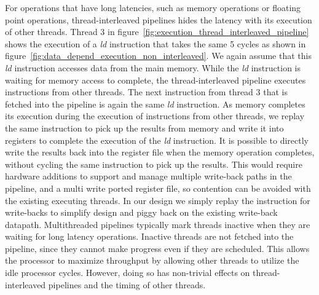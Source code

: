 For operations that have long latencies, such as memory operations or floating point operations, thread-interleaved pipelines hides the latency with its execution of other threads. 
Thread 3 in figure~\ref{fig:execution_thread_interleaved_pipeline} shows the execution of a \emph{ld} instruction that takes the same 5 cycles as shown in figure~\ref{fig:data_depend_execution_non_interleaved}.
We again assume that this \emph{ld} instruction accesses data from the main memory. 
While the \emph{ld} instruction is waiting for memory access to complete, the thread-interleaved pipeline executes instructions from other threads.
The next instruction from thread 3 that is fetched into the pipeline is again the same \emph{ld} instruction.  
As memory completes its execution during the execution of instructions from other threads, we replay the same instruction to pick up the results from memory and write it into registers to complete the execution of the \emph{ld} instruction. 
It is possible to directly write the results back into the register file when the memory operation completes, without cycling the same instruction to pick up the results.
This would require hardware additions to support and manage multiple write-back paths in the pipeline, and a multi write ported register file, so contention can be avoided with the existing executing threads.
In our design we simply replay the instruction for write-backs to simplify design and piggy back on the existing write-back datapath.
Multithreaded pipelines typically mark threads inactive when they are waiting for long latency operations.
Inactive threads are not fetched into the pipeline, since they cannot make progress even if they are scheduled. 
This allows the processor to maximize throughput by allowing other threads to utilize the idle processor cycles.   
However, doing so has non-trivial effects on thread-interleaved pipelines and the timing of other threads. 

